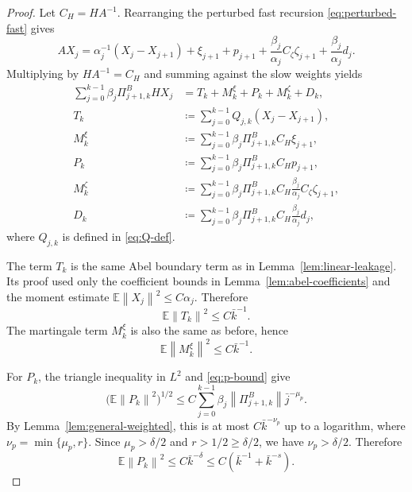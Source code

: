 \documentclass{article}
\newcommand{\E}{\mathbb{E}}
\newcommand{\norm}[1]{\left\lVert #1\right\rVert}
\begin{document}
\begin{proof}
Let $C_H=HA^{-1}$. Rearranging the perturbed fast recursion \eqref{eq:perturbed-fast} gives
\begin{equation}
  AX_j
  =\alpha_j^{-1}(X_j-X_{j+1})+\xi_{j+1}+p_{j+1}
   +\frac{\beta_j}{\alpha_j}C_\zeta\zeta_{j+1}
   +\frac{\beta_j}{\alpha_j}d_j. \label{eq:perturbed-poisson}
\end{equation}
Multiplying by $HA^{-1}=C_H$ and summing against the slow weights yields
\begin{align}
  \sum_{j=0}^{k-1}\beta_j\Pi^B_{j+1,k}HX_j
  &=T_k+M^\xi_k+P_k+M^\zeta_k+D_k, \label{eq:perturbed-decomposition}\\
  T_k&\coloneqq\sum_{j=0}^{k-1}Q_{j,k}(X_j-X_{j+1}), \label{eq:transfer-T}\\
  M^\xi_k&\coloneqq\sum_{j=0}^{k-1}\beta_j\Pi^B_{j+1,k}C_H\xi_{j+1}, \\
  P_k&\coloneqq\sum_{j=0}^{k-1}\beta_j\Pi^B_{j+1,k}C_Hp_{j+1}, \\
  M^\zeta_k&\coloneqq\sum_{j=0}^{k-1}\beta_j\Pi^B_{j+1,k}C_H\frac{\beta_j}{\alpha_j}C_\zeta\zeta_{j+1}, \\
  D_k&\coloneqq\sum_{j=0}^{k-1}\beta_j\Pi^B_{j+1,k}C_H\frac{\beta_j}{\alpha_j}d_j,
\end{align}
where $Q_{j,k}$ is defined in \eqref{eq:Q-def}.

The term $T_k$ is the same Abel boundary term as in Lemma~\ref{lem:linear-leakage}. Its proof used only the coefficient bounds in Lemma~\ref{lem:abel-coefficients} and the moment estimate $\E\norm{X_j}^2\le C\alpha_j$. Therefore
\begin{equation}
  \E\norm{T_k}^2\le C\bar k^{-1}. \label{eq:T-transfer-bound}
\end{equation}
The martingale term $M^\xi_k$ is also the same as before, hence
\begin{equation}
  \E\norm{M^\xi_k}^2\le C\bar k^{-1}. \label{eq:Mxi-transfer-bound}
\end{equation}

For $P_k$, the triangle inequality in $L^2$ and \eqref{eq:p-bound} give
\[
  \big(\E\norm{P_k}^2\big)^{1/2}
  \le C\sum_{j=0}^{k-1}\beta_j\norm{\Pi^B_{j+1,k}}\bar j^{-\mu_p}.
\]
By Lemma~\ref{lem:general-weighted}, this is at most $C\bar k^{-\nu_p}$ up to a logarithm, where $\nu_p=\min\{\mu_p,r\}$. Since $\mu_p>\delta/2$ and $r>1/2\ge\delta/2$, we have $\nu_p>\delta/2$. Therefore
\begin{equation}
  \E\norm{P_k}^2\le C\bar k^{-\delta}
  \le C\left(\bar k^{-1}+\bar k^{-s}\right). \label{eq:P-transfer-bound}
\end{equation}


\end{proof}
\end{document}
